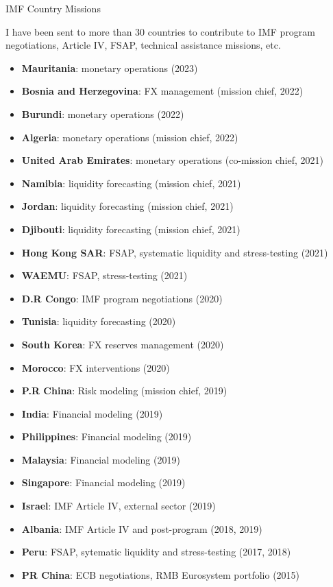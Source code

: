 \documentclass[usegeometry, 10pt, a4paper]{cv} %
\begin{document}
\newpage

\begin{rubriquetableau}[0.95\textwidth]{IMF Country Missions}
  \vspace{-0.5cm}

I have been sent to more than 30 countries to contribute to IMF program negotiations, Article IV, FSAP, technical assistance missions, etc.

\begin{multicols}{2}
\begin{itemize}
  \item \textbf{Mauritania}: monetary operations (2023)
  \item \textbf{Bosnia and Herzegovina}: FX management (mission chief, 2022)
  \item \textbf{Burundi}: monetary operations (2022)
  \item \textbf{Algeria}: monetary operations (mission chief, 2022)
  \item \textbf{United Arab Emirates}: monetary operations (co-mission chief, 2021)
  \item \textbf{Namibia}: liquidity forecasting (mission chief, 2021)
  \item \textbf{Jordan}: liquidity forecasting (mission chief, 2021)
  \item \textbf{Djibouti}: liquidity forecasting (mission chief, 2021)
  \item \textbf{Hong Kong SAR}: FSAP, systematic liquidity and stress-testing (2021)
  \item \textbf{WAEMU}: FSAP, stress-testing (2021)
  \item \textbf{D.R Congo}: IMF program negotiations (2020)
  \item \textbf{Tunisia}: liquidity forecasting (2020)
  \item \textbf{South Korea}: FX reserves management (2020)
  \item \textbf{Morocco}: FX interventions (2020)  
  \item \textbf{P.R China}: Risk modeling (mission chief, 2019) 
  \item \textbf{India}: Financial modeling (2019)
  \item \textbf{Philippines}: Financial modeling (2019)
  \item \textbf{Malaysia}: Financial modeling (2019)
  \item \textbf{Singapore}: Financial modeling (2019)
  \item \textbf{Israel}: IMF Article IV, external sector (2019)
  \item \textbf{Albania}: IMF Article IV and post-program (2018, 2019)
  \item \textbf{Peru}: FSAP, sytematic liquidity and stress-testing (2017, 2018)
  \item \textbf{PR China}: ECB negotiations, RMB Eurosystem portfolio (2015)
\end{itemize}


\end{multicols}
\end{rubriquetableau}
\end{document}
